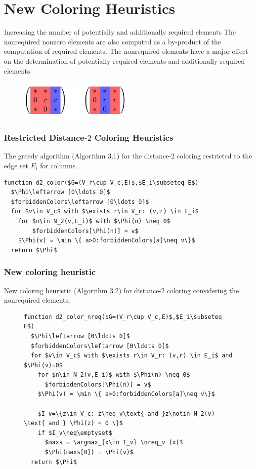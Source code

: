 \documentclass{beamer}
\DeclareMathOperator*{\argmax}{arg\,max}
\newcommand{\nreq}{L}
\begin{document}
\section{New Coloring Heuristics}
\begin{frame}{Increasing the number of potentially and additionally required elements}
The nonrequired nonzero elements are also computed as a by-product of the computation of required elements.
The nonrequired elements have a major effect on the determination of potentially required elements
and additionally required elements.
\begin{figure}
\centering
\includegraphics[width=0.5\textwidth]{increase}
\end{figure}
\end{frame}

\begin{frame}[fragile]
\frametitle{Restricted Distance-$2$ Coloring Heuristics}
{\color{green} The greedy algorithm (Algorithm 3.1)} for
the distance-$2$ coloring restricted to the edge set $E_i$
for columns.
\begin{lstlisting}[mathescape]
function d2_color($G=(V_r\cup V_c,E)$,$E_i\subseteq E$)
  $\Phi\leftarrow [0\ldots 0]$
  $forbiddenColors\leftarrow [0\ldots 0]$
  for $v\in V_c$ with $\exists r\in V_r: (v,r) \in E_i$
    for $n\in N_2(v,E_i)$ with $\Phi(n) \neq 0$
        $forbiddenColors[\Phi(n)] = v$
    $\Phi(v) = \min \{ a>0:forbiddenColors[a]\neq v\}$
  return $\Phi$
\end{lstlisting}
\end{frame}
\begin{frame}[fragile]
\frametitle{New coloring heuristic}
{\color{blue} New coloring heuristic (Algorithm 3.2)} for distance-$2$ coloring
considering the nonrequired elements.
\begin{figure}
\begin{lstlisting}[mathescape]
function d2_color_nreq($G=(V_r\cup V_c,E)$,$E_i\subseteq E$)
  $\Phi\leftarrow [0\ldots 0]$
  $forbiddenColors\leftarrow [0\ldots 0]$
  for $v\in V_c$ with $\exists r\in V_r: (v,r) \in E_i$ and $\Phi(v)=0$
    for $n\in N_2(v,E_i)$ with $\Phi(n) \neq 0$
      $forbiddenColors[\Phi(n)] = v$
    $\Phi(v) = \min \{ a>0:forbiddenColors[a]\neq v\}$

    $I_v=\{z\in V_c: z\neq v\text{ and }z\notin N_2(v) \text{ and } \Phi(z) = 0 \}$
    if $I_v\neq\emptyset$
      $maxs = \argmax_{x\in I_v} \nreq_v (x)$
      $\Phi(maxs[0]) = \Phi(v)$
  return $\Phi$
\end{lstlisting}
\end{figure}
\end{frame}
\end{document}

